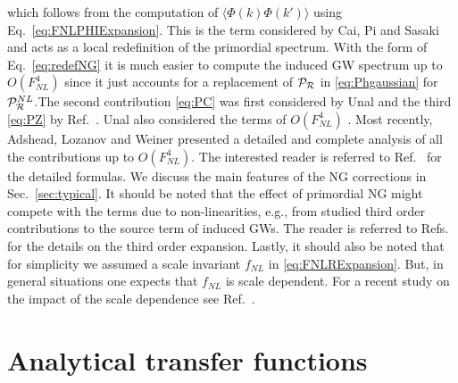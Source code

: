\documentclass[a4paper,11pt]{article}
\numberwithin{equation}{section}
\begin{document}
which follows from the computation of $\langle\Phi(k)\Phi(k')\rangle$ using Eq.~\eqref{eq:FNLPHIExpansion}. This is the term considered by Cai, Pi and Sasaki \cite{Cai:2018dig} and acts as a local redefinition of the primordial spectrum. With the form of Eq.~\eqref{eq:redefNG} it is much easier to compute the induced GW spectrum up to $O(F_{NL}^4)$ since it just accounts for a replacement of ${\cal P}_{\cal R}$ in \eqref{eq:Phgaussian} for ${\cal P}_{\cal R}^{NL}$.The second contribution \eqref{eq:PC} was first considered by Unal \cite{Unal:2018yaa} and the third \eqref{eq:PZ} by Ref.~\cite{Atal:2021jyo}. Unal also considered the terms of $O(F_{NL}^4)$ \cite{Unal:2018yaa}. Most recently, Adshead, Lozanov and Weiner \cite{Adshead:2021hnm} presented a detailed and complete analysis of all the contributions up to $O(F_{NL}^4)$. The interested reader is referred to Ref.~\cite{Adshead:2021hnm} for the detailed formulas. We discuss the main features of the NG corrections in Sec.~\ref{sec:typical}. It should be noted that the effect of primordial NG might compete with the terms due to non-linearities, e.g., from studied third order contributions to the source term of induced GWs. The reader is referred to Refs.~\cite{Yuan:2019udt,Yuan:2021qgz} for the details on the third order expansion. Lastly, it should also be noted that for simplicity we assumed a scale invariant $f_{NL}$ in \eqref{eq:FNLRExpansion}. But, in general situations one expects that $f_{NL}$ is scale dependent. For a recent study on the impact of the scale dependence see Ref.~\cite{Ragavendra:2021qdu}.



\section{Analytical transfer functions \label{sec:analytical}}
\end{document}
